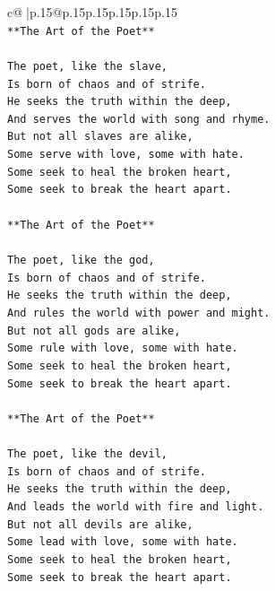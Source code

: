 \documentclass{article}
\begin{document}
{\begin{supertabular}{c@{$\;$}|p{.15\linewidth}@{}p{.15\linewidth}p{.15\linewidth}p{.15\linewidth}p{.15\linewidth}p{.15\linewidth}}
{{{\\ 
\texttt{**The Art of the Poet**} \\
\\ 
\texttt{The poet, like the slave,} \\
\texttt{Is born of chaos and of strife.} \\
\texttt{He seeks the truth within the deep,} \\
\texttt{And serves the world with song and rhyme.} \\
\texttt{But not all slaves are alike,} \\
\texttt{Some serve with love, some with hate.} \\
\texttt{Some seek to heal the broken heart,} \\
\texttt{Some seek to break the heart apart.} \\
\\ 
\texttt{**The Art of the Poet**} \\
\\ 
\texttt{The poet, like the god,} \\
\texttt{Is born of chaos and of strife.} \\
\texttt{He seeks the truth within the deep,} \\
\texttt{And rules the world with power and might.} \\
\texttt{But not all gods are alike,} \\
\texttt{Some rule with love, some with hate.} \\
\texttt{Some seek to heal the broken heart,} \\
\texttt{Some seek to break the heart apart.} \\
\\ 
\texttt{**The Art of the Poet**} \\
\\ 
\texttt{The poet, like the devil,} \\
\texttt{Is born of chaos and of strife.} \\
\texttt{He seeks the truth within the deep,} \\
\texttt{And leads the world with fire and light.} \\
\texttt{But not all devils are alike,} \\
\texttt{Some lead with love, some with hate.} \\
\texttt{Some seek to heal the broken heart,} \\
\texttt{Some seek to break the heart apart.} \\
\\ 
}}}
\end{supertabular}}
\end{document}
